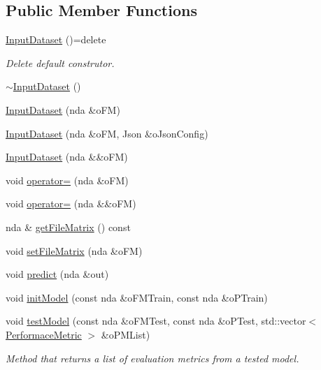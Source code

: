 \subsection*{Public Member Functions}
\begin{DoxyCompactItemize}
\item 
\mbox{\label{classmodel__api_1_1InputDataset_a410e07ea3fe528370ff45f7e1833f5ec}} 
\hyperlink{classmodel__api_1_1InputDataset_a410e07ea3fe528370ff45f7e1833f5ec}{Input\+Dataset} ()=delete
\begin{DoxyCompactList}\small\item\em Delete default construtor. \end{DoxyCompactList}\item 
\hyperlink{classmodel__api_1_1InputDataset_a31f12b83db2195f609dfc8af27cdbc58}{$\sim$\+Input\+Dataset} ()
\item 
\hyperlink{classmodel__api_1_1InputDataset_a5fd9fc18bbd147d612acb16a808a135c}{Input\+Dataset} (nda \&o\+FM)
\item 
\hyperlink{classmodel__api_1_1InputDataset_a1743888ce461e7fa367ee6d2aad70082}{Input\+Dataset} (nda \&o\+FM, Json \&o\+Json\+Config)
\item 
\hyperlink{classmodel__api_1_1InputDataset_a213885343387992b05a173ecb70a628f}{Input\+Dataset} (nda \&\&o\+FM)
\item 
void \hyperlink{classmodel__api_1_1InputDataset_a59c9f5a14675794a67ef0eafa7550d8d}{operator=} (nda \&o\+FM)
\item 
void \hyperlink{classmodel__api_1_1InputDataset_a192c20a95f93e03b4c4adb07e8e5e077}{operator=} (nda \&\&o\+FM)
\item 
nda \& \hyperlink{classmodel__api_1_1InputDataset_a853b380f548e21ee7421f887b9be2722}{get\+File\+Matrix} () const
\item 
void \hyperlink{classmodel__api_1_1InputDataset_a71111535a17422db1f0fdbe2ac6ce1c8}{set\+File\+Matrix} (nda \&o\+FM)
\item 
void \hyperlink{classmodel__api_1_1InputDataset_af25824b44f866ff2b03e5d1036d7215a}{predict} (nda \&out)
\item 
void \hyperlink{classmodel__api_1_1InputDataset_af7d130afc8889825573e738906397714}{init\+Model} (const nda \&o\+F\+M\+Train, const nda \&o\+P\+Train)
\item 
void \hyperlink{classmodel__api_1_1InputDataset_a0829ebb09eca7632e7032f40d451c70d}{test\+Model} (const nda \&o\+F\+M\+Test, const nda \&o\+P\+Test, std\+::vector$<$ \hyperlink{structPerformaceMetric}{Performace\+Metric} $>$ \&o\+P\+M\+List)
\begin{DoxyCompactList}\small\item\em Method that returns a list of evaluation metrics from a tested model. \end{DoxyCompactList}\end{DoxyCompactItemize}
